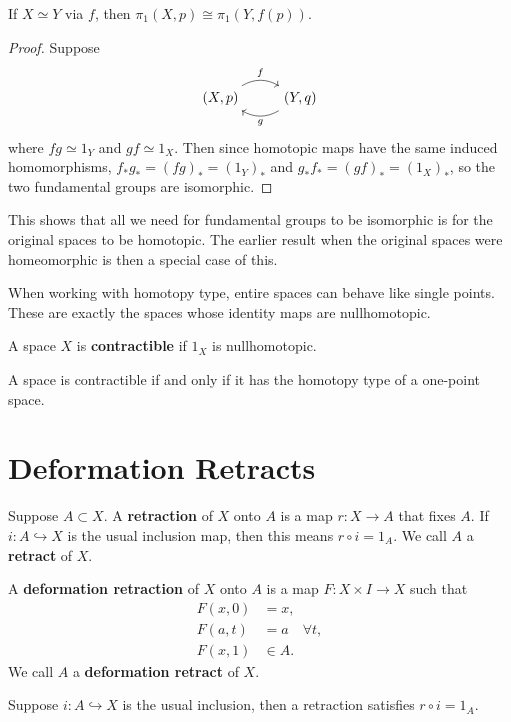 \documentclass[twoside,10pt]{report}
\begin{document}
\begin{prop}
	If $X \simeq Y$ via $f$, then $\pi_1(X,p)\cong \pi_1(Y,f(p))$.
\end{prop}
\begin{proof}
	Suppose
	\[
        \begin{tikzcd}
                (X,p)\arrow[r,"f",bend left]&(Y,q)\arrow[l,"g",bend left]
        \end{tikzcd}
        \]
	where $fg \simeq 1_{Y}$ and $gf \simeq 1_{X}$. Then since homotopic maps have the same induced homomorphisms, $f_{*}g_{*}=(fg)_{*}=(1_{Y})_{*}$ and $g_{*}f_{*}=(gf)_{*}=(1_{X})_{*}$, so the two fundamental groups are isomorphic.
\end{proof}
This shows that all we need for fundamental groups to be isomorphic is for the original spaces to be homotopic. The earlier result when the original spaces were homeomorphic is then a special case of this.

When working with homotopy type, entire spaces can behave like single points. These are exactly the spaces whose identity maps are nullhomotopic.

\begin{defn}[]
A space $X$ is \textbf{contractible} if $1_{X}$ is nullhomotopic.
\end{defn}

\begin{prop}
A space is contractible if and only if it has the homotopy type of a one-point space.
\end{prop}



\section{Deformation Retracts}

\begin{defn}[]
	Suppose $A \subset X$. A \textbf{retraction} of $X$ onto $A$ is a map $r:X\to A$ that fixes $A$. If $i:A\hookrightarrow X$ is the usual inclusion map, then this means $r\circ i = 1_{A}$. We call $A$ a \textbf{retract} of $X$.

	A \textbf{deformation retraction} of $X$ onto $A$ is a map $F:X\times I \to X$ such that
	\begin{align*}
		F(x,0)&=x,\\
		F(a,t)&=a \quad \forall t,\\
		F(x,1)&\in A.
	\end{align*}
	We call $A$ a \textbf{deformation retract} of $X$.
\end{defn}
Suppose $i:A\hookrightarrow X$ is the usual inclusion, then a retraction satisfies $r \circ i = 1_{A}$.
\end{document}
